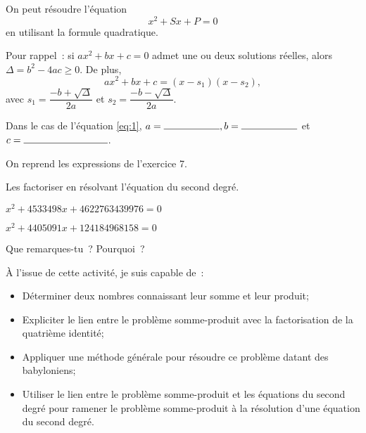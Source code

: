 \documentclass[a4paper,12pt]{report}
\begin{document}
	\vspace{15pt}
	\myrulefill
	\vspace{15pt}

	\myrulefill

	\vspace{15pt}
	\myrulefill
	\vspace{15pt}

	\myrulefill
	\vspace{15pt}

	\newpage


On peut résoudre l'équation 
\begin{equation}
	x^2+Sx+P=0 \label{eq:1}
\end{equation}
en utilisant la formule quadratique. 

Pour rappel~: si $ax^2+bx+c=0$ admet une ou deux solutions réelles, alors
$\Delta=b^2-4ac\geq 0$. De plus, 
\[ax^2+bx+c=(x-s_1)(x-s_2),\]
avec $s_1=\dfrac{-b+\sqrt{\Delta}}{2a}$ et $s_2=\dfrac{-b-\sqrt{\Delta}}{2a}$. 

Dans le cas de l'équation \eqref{eq:1}, $a=\ligne{2}, b=\ligne{2}$ et $c=\ligne{3}$. 

\begin{exo}
	On reprend les expressions de l'exercice 7.
	\begin{tasks}	
	\task  Les factoriser en résolvant l'équation du second degré.

$x^2+4533498x+4622763439976=0$

\framebox[0.9\textwidth]{\rule{0pt}{160pt}}

$x^2+4405091x+124184968158=0$

\framebox[0.9\textwidth]{\rule{0pt}{160pt}}
	\task Que remarques-tu~? Pourquoi~?

	\myrulefill
	\vspace{15pt}

	\myrulefill
	\vspace{15pt}

	\myrulefill


	\end{tasks}
\end{exo}

À l'issue de cette activité, je suis capable de~:
\begin{itemize}
	\item Déterminer deux nombres connaissant leur somme et leur produit;
	\item Expliciter le lien entre le problème somme-produit avec la factorisation de la quatrième identité;
	\item  Appliquer une méthode générale pour résoudre ce problème datant des babyloniens;
	\item  Utiliser le lien entre le problème somme-produit et les équations du second degré pour ramener le problème somme-produit à la résolution d'une équation du second degré.
\end{itemize}
\end{document}
